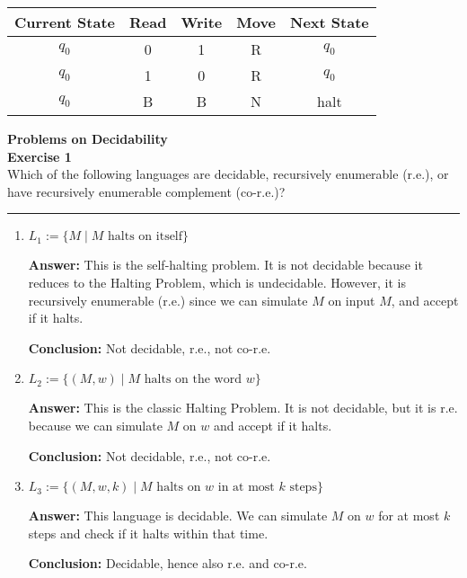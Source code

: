 \documentclass{article}
\theoremstyle{theorem}
\theoremstyle{definition}
\theoremstyle{remark}
\begin{document}
\begin{enumerate}
\begin{center}
\begin{tabular}{|c|c|c|c|c|}
\hline
Current State & Read & Write & Move & Next State \\
\hline
$q_0$ & 0 & 1 & R & $q_0$ \\
$q_0$ & 1 & 0 & R & $q_0$ \\
$q_0$ & B & B & N & halt \\
\hline
\end{tabular}
\end{center}
\end{enumerate}

\textbf{Problems on Decidability}\\
\textbf{Exercise 1}\\
Which of the following languages are decidable, recursively enumerable (r.e.), or have recursively enumerable complement (co-r.e.)?
\vspace{0.5em}
\hrule
\vspace{0.5em}
\begin{enumerate}
    \item \( L_1 := \{ M \mid \text{$M$ halts on itself} \} \)
    
    \textbf{Answer:} This is the self-halting problem. It is not decidable because it reduces to the Halting Problem, which is undecidable. However, it is recursively enumerable (r.e.) since we can simulate \( M \) on input \( M \), and accept if it halts.
    
    \textbf{Conclusion:} Not decidable, r.e., not co-r.e.

    \item \( L_2 := \{ (M, w) \mid \text{$M$ halts on the word $w$} \} \)
    
    \textbf{Answer:} This is the classic Halting Problem. It is not decidable, but it is r.e. because we can simulate \( M \) on \( w \) and accept if it halts.
    
    \textbf{Conclusion:} Not decidable, r.e., not co-r.e.

    \item \( L_3 := \{ (M, w, k) \mid \text{$M$ halts on $w$ in at most $k$ steps} \} \)

    \textbf{Answer:} This language is decidable. We can simulate \( M \) on \( w \) for at most \( k \) steps and check if it halts within that time.
    
    \textbf{Conclusion:} Decidable, hence also r.e. and co-r.e.
\end{enumerate}
\end{document}
